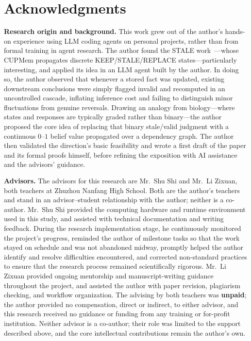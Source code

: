\documentclass{article}
\theoremstyle{definition}
\begin{document}

\clearpage
\section*{Acknowledgments}

\noindent\textbf{Research origin and background.}
This work grew out of the author's hands-on experience using LLM coding
agents on personal projects, rather than from formal training in agent
research. The author found the STALE work~\cite{stale2026}---whose CUPMem
propagates discrete KEEP/STALE/REPLACE states---particularly interesting,
and applied its idea in an LLM agent built by the author. In doing so, the
author observed that whenever a stored fact was updated, existing
downstream conclusions were simply flagged invalid and recomputed in an
uncontrolled cascade, inflating inference cost and failing to distinguish
minor fluctuations from genuine reversals. Drawing an analogy from
biology---where states and responses are typically graded rather than
binary---the author proposed the core idea of replacing that binary
stale/valid judgment with a continuous $0$--$1$ belief value propagated
over a dependency graph. The author then validated the direction's basic
feasibility and wrote a first draft of the paper and its formal proofs
himself, before refining the exposition with AI assistance and the
advisors' guidance.

\noindent\textbf{Advisors.}
The advisors for this research are Mr.~Shu Shi and Mr.~Li Zixuan, both
teachers at Zhuzhou Nanfang High School. Both are the author's teachers
and stand in an advisor--student relationship with the author; neither is
a co-author. Mr.~Shu Shi provided the computing hardware and runtime
environment used in this study, and assisted with technical documentation
and writing feedback. During the research implementation stage, he
continuously monitored the project's progress, reminded the author of
milestone tasks so that the work stayed on schedule and was not abandoned
midway, promptly helped the author identify and resolve difficulties
encountered, and corrected non-standard practices to ensure that the
research process remained scientifically rigorous. Mr.~Li Zixuan provided
ongoing mentorship and manuscript-writing guidance throughout the project,
and assisted the author with paper revision, plagiarism checking, and
workflow organization. The advising by both teachers was \textbf{unpaid};
the author provided no compensation, direct or indirect, to either
advisor, and this research received no guidance or funding from any
training or for-profit institution. Neither advisor is a co-author; their
role was limited to the support described above, and the core intellectual
contributions remain the author's own.
\end{document}
